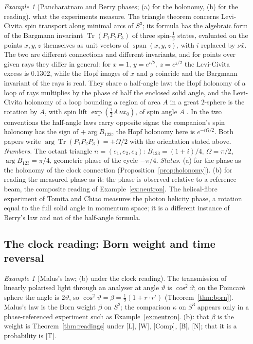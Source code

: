 \documentclass[aps,pra,onecolumn,superscriptaddress,nofootinbib,10pt]{revtex4-2}
\theoremstyle{definition}
\theoremstyle{remark}
\newtheorem{example}[theorem]{Example}
\begin{document}
\begin{example}[Pancharatnam and Berry phases; (a) for the holonomy, (b) for the reading]
what the experiments measure.  The triangle theorem \cite[Thm.~9.9]{PaperI} concerns Levi-Civita spin
transport along minimal arcs of $S^3$; its formula has the algebraic form of the Bargmann invariant
$\operatorname{Tr}(P_1P_2P_3)$ of three spin-$\tfrac12$ states, evaluated on the points $x,y,z$ themselves as unit vectors of
$\operatorname{span}(x,y,z)$, with $i$ replaced by $\nu\bar x$.  The two are different connections and different invariants, and
for points over given rays they differ in general: for $x=1$, $y=e^{i/2}$, $z=e^{j/2}$ the Levi-Civita excess is
$0.1302$, while the Hopf images of $x$ and $y$ coincide and the Bargmann invariant of the rays is real.
They share a half-angle law: the Hopf holonomy of a loop of rays multiplies by the phase of half the
enclosed solid angle, and the Levi-Civita holonomy of a loop bounding a region of area $A$ in a great
$2$-sphere is the rotation by $A$, with spin lift $\exp(\tfrac12A\,\nu\bar x_0)$, of spin angle $A$
\cite[Cor.~9.11(ii), Thm.~9.14]{PaperI}.  In the two conventions the half-angle laws carry opposite signs:
the companion's spin holonomy has the sign of $+\arg B_{123}$, the Hopf holonomy here is $e^{-i\Omega/2}$.  Both papers write $\arg\operatorname{Tr}(P_1P_2P_3)=+\Omega/2$ with the orientation
stated above.
\emph{Numbers.}  The octant triangle $n=(e_1,e_2,e_3)$: $B_{123}=(1+i)/4$, $\Omega=\pi/2$, $\arg B_{123}=\pi/4$, geometric phase of the cycle $-\pi/4$.
\emph{Status.}  (a) for the phase as the holonomy of the clock connection (Proposition~\ref{prop:holonomy}).
(b) for reading the measured phase as it: the phase is observed relative to a reference beam, the
composite reading of Example~\ref{ex:neutron}.  The helical-fibre experiment of Tomita and Chiao
\cite{ex-TC86} measures the photon helicity phase, a rotation equal to the full solid angle in momentum
space; it is a different instance of Berry's law and not of the half-angle formula.
\end{example}

\subsection{The clock reading: Born weight and time reversal}

\begin{example}[Malus's law; (b) under the clock reading]\label{ex:malus}
The transmission of linearly polarised light through an analyser at angle $\vartheta$ is $\cos^2\vartheta$; on the
Poincar\'e sphere the angle is $2\vartheta$, so $\cos^2\vartheta=\beta=\tfrac12(1+r\cdot r')$ (Theorem~\ref{thm:born}).  Malus's
law is the Born weight $\beta$ on $S^2$; the comparison $\kappa$ on $S^3$ appears only in a phase-referenced
experiment such as Example~\ref{ex:neutron}.  (b): that $\beta$ is the weight is Theorem~\ref{thm:readings}
under [L], [W], [Comp], [B], [N]; that it is a probability is [T].
\end{example}
\end{document}
